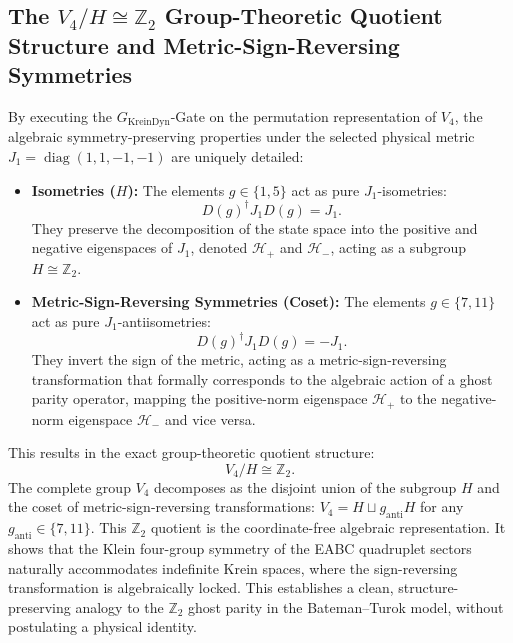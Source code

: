 \documentclass[11pt,a4paper]{article}
\theoremstyle{definition}
\begin{document}
	\subsection{The $V_4 / H \cong \mathbb{Z}_2$ Group-Theoretic Quotient Structure and Metric-Sign-Reversing Symmetries}
	By executing the $G_{\mathrm{KreinDyn}}$-Gate on the permutation representation of $V_4$, the algebraic symmetry-preserving properties under the selected physical metric $J_1 = \operatorname{diag}(1, 1, -1, -1)$ are uniquely detailed:
	\begin{itemize}
		\item \textbf{Isometries ($H$):} The elements $g \in \{1, 5\}$ act as pure $J_1$-isometries:
		\begin{equation}
			D(g)^\dagger J_1 D(g) = J_1.
		\end{equation}
		They preserve the decomposition of the state space into the positive and negative eigenspaces of $J_1$, denoted $\mathcal{H}_+$ and $\mathcal{H}_-$, acting as a subgroup $H \cong \mathbb{Z}_2$.
		\item \textbf{Metric-Sign-Reversing Symmetries (Coset):} The elements $g \in \{7, 11\}$ act as pure $J_1$-antiisometries:
		\begin{equation}
			D(g)^\dagger J_1 D(g) = -J_1.
		\end{equation}
		They invert the sign of the metric, acting as a metric-sign-reversing transformation that formally corresponds to the algebraic action of a ghost parity operator, mapping the positive-norm eigenspace $\mathcal{H}_+$ to the negative-norm eigenspace $\mathcal{H}_-$ and vice versa.
	\end{itemize}
	This results in the exact group-theoretic quotient structure:
	\begin{equation}
		\boxed{V_4 / H \cong \mathbb{Z}_2}.
	\end{equation}
	The complete group $V_4$ decomposes as the disjoint union of the subgroup $H$ and the coset of metric-sign-reversing transformations: $V_4 = H \sqcup g_{\mathrm{anti}} H$ for any $g_{\mathrm{anti}} \in \{7, 11\}$. This $\mathbb{Z}_2$ quotient is the coordinate-free algebraic representation. It shows that the Klein four-group symmetry of the EABC quadruplet sectors naturally accommodates indefinite Krein spaces, where the sign-reversing transformation is algebraically locked. This establishes a clean, structure-preserving analogy to the $\mathbb{Z}_2$ ghost parity in the Bateman--Turok model, without postulating a physical identity.
	
\end{document}
